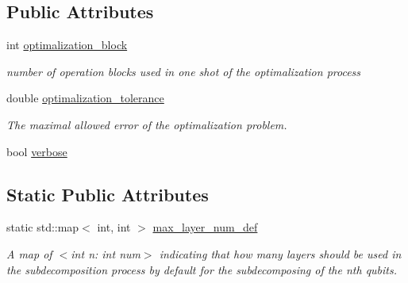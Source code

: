 \subsection*{Public Attributes}
\begin{DoxyCompactItemize}
\item 
int \hyperlink{class_decomposition___base_adae1205825aea9a9544d9ca42855b849}{optimalization\+\_\+block}
\begin{DoxyCompactList}\small\item\em number of operation blocks used in one shot of the optimalization process \end{DoxyCompactList}\item 
double \hyperlink{class_decomposition___base_ae08336b2cdfc58bbd03ba231716f28dd}{optimalization\+\_\+tolerance}
\begin{DoxyCompactList}\small\item\em The maximal allowed error of the optimalization problem. \end{DoxyCompactList}\item 
bool \hyperlink{class_decomposition___base_a0636a9e49a19f7167b7abdf309882042}{verbose}
\end{DoxyCompactItemize}
\subsection*{Static Public Attributes}
\begin{DoxyCompactItemize}
\item 
static std\+::map$<$ int, int $>$ \hyperlink{class_decomposition___base_a17952d9e72bbc214eb3a1466270b853d}{max\+\_\+layer\+\_\+num\+\_\+def}
\begin{DoxyCompactList}\small\item\em A map of $<$int n\+: int num$>$ indicating that how many layers should be used in the subdecomposition process by default for the subdecomposing of the nth qubits. \end{DoxyCompactList}\end{DoxyCompactItemize}
